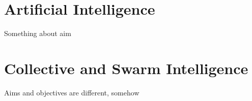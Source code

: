 \section{Artificial Intelligence}
Something about aim

\section{Collective and Swarm Intelligence}
Aims and objectives are different, somehow
